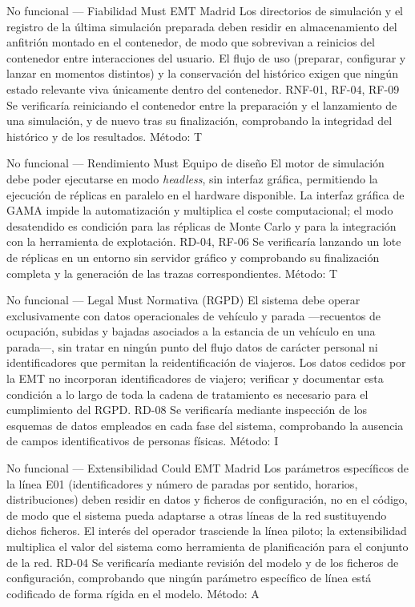 {No funcional --- Fiabilidad}
{Must}
{EMT Madrid}
{Los directorios de simulación y el registro de la última simulación preparada deben residir en almacenamiento
del anfitrión montado en el contenedor, de modo que sobrevivan a reinicios del contenedor entre interacciones del usuario.}
{El flujo de uso (preparar, configurar y lanzar en momentos distintos) y la conservación del histórico exigen
que ningún estado relevante viva únicamente dentro del contenedor.}
{RNF-01, RF-04, RF-09}
{Se verificaría reiniciando el contenedor entre la preparación y el lanzamiento de una simulación, y de nuevo tras
su finalización, comprobando la integridad del histórico y de los resultados. Método: T}

{No funcional --- Rendimiento}
{Must}
{Equipo de diseño}
{El motor de simulación debe poder ejecutarse en modo \textit{headless}, sin interfaz gráfica, permitiendo
la ejecución de réplicas en paralelo en el hardware disponible.}
{La interfaz gráfica de GAMA impide la automatización y multiplica el coste computacional; el modo desatendido
es condición para las réplicas de Monte Carlo y para la integración con la herramienta de explotación.}
{RD-04, RF-06}
{Se verificaría lanzando un lote de réplicas en un entorno sin servidor gráfico y comprobando su finalización
completa y la generación de las trazas correspondientes. Método: T}

{No funcional --- Legal}
{Must}
{Normativa (RGPD)}
{El sistema debe operar exclusivamente con datos operacionales de vehículo y parada ---recuentos de ocupación,
subidas y bajadas asociados a la estancia de un vehículo en una parada---, sin tratar en ningún punto del flujo
datos de carácter personal ni identificadores que permitan la reidentificación de viajeros.}
{Los datos cedidos por la EMT no incorporan identificadores de viajero; verificar y documentar esta condición a lo
largo de toda la cadena de tratamiento es necesario para el cumplimiento del RGPD.}
{RD-08}
{Se verificaría mediante inspección de los esquemas de datos empleados en cada fase del sistema, comprobando la
ausencia de campos identificativos de personas físicas. Método: I}

{No funcional --- Extensibilidad}
{Could}
{EMT Madrid}
{Los parámetros específicos de la línea E01 (identificadores y número de paradas por sentido, horarios,
distribuciones) deben residir en datos y ficheros de configuración, no en el código, de modo que el sistema
pueda adaptarse a otras líneas de la red sustituyendo dichos ficheros.}
{El interés del operador trasciende la línea piloto; la extensibilidad multiplica el valor del sistema como
herramienta de planificación para el conjunto de la red.}
{RD-04}
{Se verificaría mediante revisión del modelo y de los ficheros de configuración, comprobando que ningún parámetro
específico de línea está codificado de forma rígida en el modelo. Método: A}



